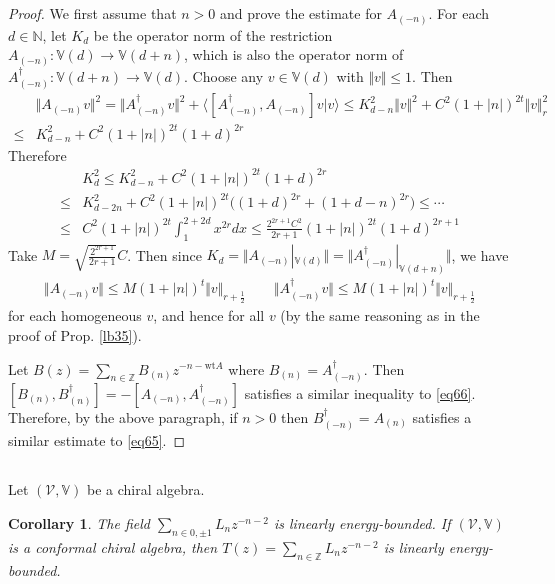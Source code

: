 \documentclass[12pt,b5paper,notitlepage]{article}
\theoremstyle{definition}
\theoremstyle{plain}
\newtheorem{co}[df]{Corollary}
\newcommand{\mc}{\mathcal}
\newcommand{\bk}[1]{\langle {#1}\rangle}
\newcommand{\Vbb}{\mathbb V}
\newcommand{\Nbb}{\mathbb N}
\newcommand{\Zbb}{\mathbb Z}
\newcommand{\wt}{\mathrm{wt}}
\numberwithin{equation}{section}
\begin{document}
\begin{proof}
We first assume that $n>0$ and prove the estimate for $A_{(-n)}$. For each $d\in\Nbb$, let $K_d$ be the operator norm of the restriction $A_{(-n)}:\Vbb(d)\rightarrow\Vbb(d+n)$, which is also the operator norm of $A_{(-n)}^\dagger:\Vbb(d+n)\rightarrow\Vbb(d)$. Choose any $v\in\Vbb(d)$ with $\Vert v\Vert\leq 1$. Then
\begin{align*}
&\Vert A_{(-n)}v\Vert^2=\Vert A_{(-n)}^\dagger v\Vert^2+\bk{[A_{(-n)}^\dagger,A_{(-n)}]v|v}\leq K_{d-n}^2\Vert v\Vert^2+C^2(1+|n|)^{2t}\Vert v\Vert_r^2\\
\leq& K_{d-n}^2+C^2(1+|n|)^{2t}(1+d)^{2r}
\end{align*}
Therefore
\begin{align*}
&K_d^2\leq K_{d-n}^2+C^2(1+|n|)^{2t}(1+d)^{2r}\\
\leq& K_{d-2n}^2+C^2(1+|n|)^{2t}\big((1+d)^{2r}+(1+d-n)^{2r}\big)\leq\cdots\\
\leq& C^2(1+|n|)^{2t}\int_1^{2+2d}x^{2r}dx\leq \frac{2^{2r+1}C^2}{2r+1}(1+|n|)^{2t}(1+d)^{2r+1}
\end{align*}
Take $M=\sqrt{\frac{2^{2r+1}}{2r+1}}C$. Then since $K_d=\Vert A_{(-n)}|_{\Vbb(d)}\Vert=\Vert A_{(-n)}^\dagger|_{\Vbb(d+n)}\Vert$, we have
\begin{align*}
\Vert A_{(-n)}v\Vert \leq M(1+|n|)^t\Vert v\Vert_{r+\frac 12}\qquad \Vert A_{(-n)}^\dagger v\Vert \leq M(1+|n|)^t\Vert v\Vert_{r+\frac 12}
\end{align*}
for each homogeneous $v$, and hence for all $v$ (by the same reasoning as in the proof of Prop. \ref{lb35}).

Let $B(z)=\sum_{n\in\Zbb}B_{(n)}z^{-n-\wt A}$ where $B_{(n)}=A_{(-n)}^\dagger$. Then $[B_{(n)},B_{(n)}^\dagger]=-[A_{(-n)},A_{(-n)}^\dagger]$ satisfies a similar inequality to \eqref{eq66}. Therefore, by the above paragraph, if $n>0$ then $B_{(-n)}^\dagger=A_{(n)}$ satisfies a similar estimate to \eqref{eq65}.
\end{proof}




\subsection{}

Let $(\mc V,\Vbb)$ be a chiral algebra. 

\begin{co}\label{lb43}
The field $\sum_{n\in 0,\pm1}L_nz^{-n-2}$ is linearly energy-bounded. If $(\mc V,\Vbb)$ is a conformal chiral algebra, then $T(z)=\sum_{n\in\Zbb}L_nz^{-n-2}$ is linearly energy-bounded.
\end{co}
\end{document}
